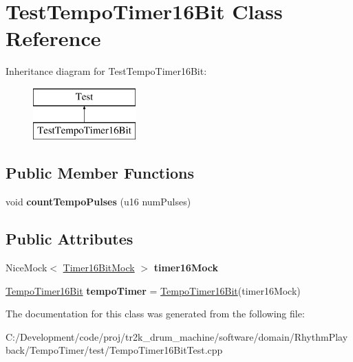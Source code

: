 \hypertarget{class_test_tempo_timer16_bit}{}\section{Test\+Tempo\+Timer16\+Bit Class Reference}
\label{class_test_tempo_timer16_bit}
Inheritance diagram for Test\+Tempo\+Timer16\+Bit\+:\begin{figure}[H]
\begin{center}
\leavevmode
\includegraphics[height=2.000000cm]{class_test_tempo_timer16_bit}
\end{center}
\end{figure}
\subsection*{Public Member Functions}
\begin{DoxyCompactItemize}
\item 
\mbox{\label{class_test_tempo_timer16_bit_a0686c53579db8bafbc86afb8159254de}} 
void {\bfseries count\+Tempo\+Pulses} (u16 num\+Pulses)
\end{DoxyCompactItemize}
\subsection*{Public Attributes}
\begin{DoxyCompactItemize}
\item 
\mbox{\label{class_test_tempo_timer16_bit_aa260c814720ac243dae4f16949730bea}} 
Nice\+Mock$<$ \mbox{\hyperlink{class_timer16_bit_mock}{Timer16\+Bit\+Mock}} $>$ {\bfseries timer16\+Mock}
\item 
\mbox{\label{class_test_tempo_timer16_bit_ab636f3982d6a96505efd66385f111814}} 
\mbox{\hyperlink{class_tempo_timer16_bit}{Tempo\+Timer16\+Bit}} {\bfseries tempo\+Timer} = \mbox{\hyperlink{class_tempo_timer16_bit}{Tempo\+Timer16\+Bit}}(timer16\+Mock)
\end{DoxyCompactItemize}


The documentation for this class was generated from the following file\+:\begin{DoxyCompactItemize}
\item 
C\+:/\+Development/code/proj/tr2k\+\_\+drum\+\_\+machine/software/domain/\+Rhythm\+Playback/\+Tempo\+Timer/test/Tempo\+Timer16\+Bit\+Test.\+cpp\end{DoxyCompactItemize}
